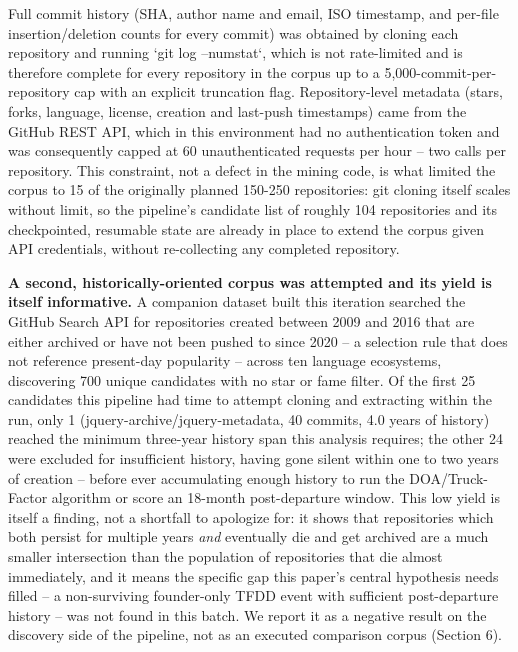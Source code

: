 \documentclass[11pt,letterpaper]{article}
\begin{document}
Full commit history (SHA, author name and email, ISO timestamp, and per-file insertion/deletion counts for every commit) was obtained by cloning each repository and running `git log --numstat`, which is not rate-limited and is therefore complete for every repository in the corpus up to a 5,000-commit-per-repository cap with an explicit truncation flag. Repository-level metadata (stars, forks, language, license, creation and last-push timestamps) came from the GitHub REST API, which in this environment had no authentication token and was consequently capped at 60 unauthenticated requests per hour -- two calls per repository. This constraint, not a defect in the mining code, is what limited the corpus to 15 of the originally planned 150-250 repositories: git cloning itself scales without limit, so the pipeline's candidate list of roughly 104 repositories and its checkpointed, resumable state are already in place to extend the corpus given API credentials, without re-collecting any completed repository.

\textbf{A second, historically-oriented corpus was attempted and its yield is itself informative.} A companion dataset built this iteration searched the GitHub Search API for repositories created between 2009 and 2016 that are either archived or have not been pushed to since 2020 -- a selection rule that does not reference present-day popularity -- across ten language ecosystems, discovering 700 unique candidates with no star or fame filter. Of the first 25 candidates this pipeline had time to attempt cloning and extracting within the run, only 1 (jquery-archive/jquery-metadata, 40 commits, 4.0 years of history) reached the minimum three-year history span this analysis requires; the other 24 were excluded for insufficient history, having gone silent within one to two years of creation -- before ever accumulating enough history to run the DOA/Truck-Factor algorithm or score an 18-month post-departure window. This low yield is itself a finding, not a shortfall to apologize for: it shows that repositories which both persist for multiple years \emph{and} eventually die and get archived are a much smaller intersection than the population of repositories that die almost immediately, and it means the specific gap this paper's central hypothesis needs filled -- a non-surviving founder-only TFDD event with sufficient post-departure history -- was not found in this batch. We report it as a negative result on the discovery side of the pipeline, not as an executed comparison corpus (Section 6).
\end{document}
